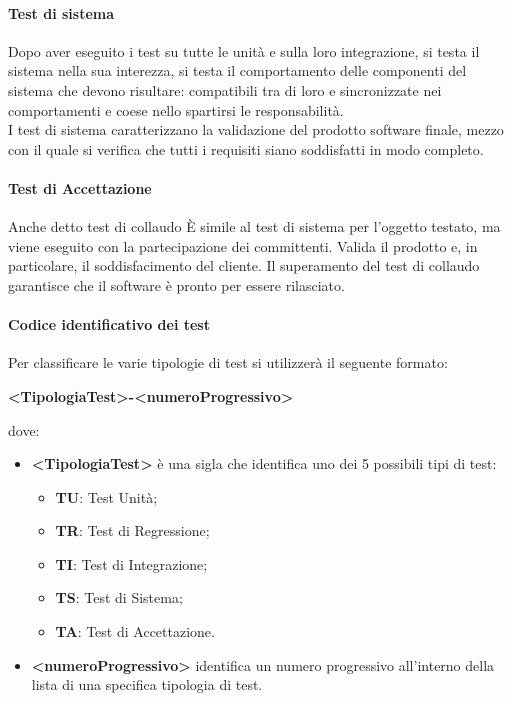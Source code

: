 				\paragraph{Test di sistema}
					Dopo aver eseguito i test su tutte le unità e sulla loro integrazione, si testa il sistema nella sua interezza, si testa il comportamento delle componenti del sistema che devono risultare: compatibili tra di loro e sincronizzate nei comportamenti e coese nello spartirsi le responsabilità.\\
					I test di sistema caratterizzano la validazione del prodotto software finale, mezzo con il quale si verifica che tutti i requisiti siano soddisfatti in modo completo.\\
				\paragraph{Test di Accettazione}
					Anche detto test di collaudo È simile al test di sistema per l’oggetto testato, ma viene eseguito con la partecipazione dei committenti. Valida il prodotto e, in particolare, il soddisfacimento del cliente. Il superamento del test di collaudo garantisce che il software è pronto per essere rilasciato.
				\paragraph{Codice identificativo dei test}
					Per classificare le varie tipologie di test si utilizzerà il seguente formato:
					\begin{center}
						\textbf{<TipologiaTest>-<numeroProgressivo>}
					\end{center}
					dove:
					\begin{itemize}
						\item\textbf{<TipologiaTest> } è una sigla che identifica uno dei 5 possibili tipi di test:
							\begin{itemize}
								\item\textbf{TU}: Test Unità;
								\item\textbf{TR}: Test di Regressione;
								\item\textbf{TI}: Test di Integrazione;
								\item\textbf{TS}: Test di Sistema;
								\item\textbf{TA}: Test di Accettazione.
							\end{itemize}
						\item\textbf{<numeroProgressivo>} identifica un numero progressivo all’interno della lista di una specifica tipologia di test.
					\end{itemize}
